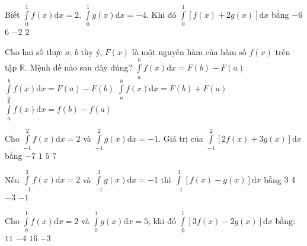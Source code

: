 \begin{ex}%
Biết $ \displaystyle \int\limits_{0}^{1}f(x)\mathrm{d}x=2 $, $ \displaystyle \int\limits_{0}^{1}g(x)\mathrm{d}x=-4 $. Khi đó $ \displaystyle \int\limits_{0}^{1}\left[f(x)+2g(x)\right]\mathrm{d}x $ bằng
\choice
{\True $ -6 $}
{$ 6 $}
{$ -2 $}
{$ 2 $}
\end{ex}

\begin{ex}%
Cho hai số thực $a$; $b$ tùy ý, $F(x)$ là một nguyên hàm của hàm số $f(x)$ trên tập $\mathbb{R}$. Mệnh đề nào sau đây đúng?
\choice
{\True $\displaystyle\int\limits_a^b{f(x)\mathrm{d}x}=F(b)-F(a)$}
{$\displaystyle\int\limits_a^b{f(x)\mathrm{d}x}=F(a)-F(b)$}
{$\displaystyle\int\limits_a^b{f(x)\mathrm{d}x}=F(b)+F(a)$}
{$\displaystyle\int\limits_a^b{f(x)\mathrm{d}x}=f(b)-f(a)$}
\end{ex}

\begin{ex}%
Cho $\displaystyle\int\limits_{-1}^2f(x)\mathrm{d}x=2$ và $\displaystyle\int\limits_{-1}^2g(x)\mathrm{d}x=-1$. Giá trị của $\displaystyle\int\limits_{-1}^2\left[2f(x)+3g(x)\right]\mathrm{d}x$ bằng
\choice
{$ -7 $}
{\True $ 1 $}
{$ 5 $}
{$ 7 $}
\end{ex}

\begin{ex}%
Nếu $\displaystyle\int\limits_{-1}^3f(x)\mathrm{d}x=2$ và $\displaystyle\int\limits_{-1}^3g(x)\mathrm{d}x=-1$ thì $\displaystyle\int\limits_{-1}^3\left[f(x)-g(x)\right]\mathrm{d}x$ bằng
\choice
{\True $ 3 $}
{$ 4 $}
{$ -3 $}
{$ -1 $}
\end{ex}

\begin{ex}%
Cho $\displaystyle\int\limits_{0}^{1}f(x)\mathrm{d}x=2$ và $\displaystyle\int\limits_0^1g(x)\mathrm{d}x=5$, khi đó $\displaystyle\int\limits_0^1\left[3f(x)-2g(x)\right]\mathrm{d}x$ bằng:
\choice
{$11$}
{\True $-4$}
{$16$}
{$-3$}
\end{ex}

